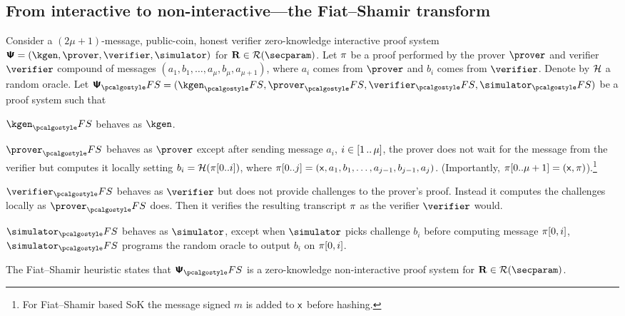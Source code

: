 \subsection{From interactive to non-interactive---the Fiat--Shamir transform}
Consider a $(2\mu + 1)$-message, public-coin, honest verifier zero-knowledge
interactive proof system
$\proofsystem = (\kgen, \prover, \verifier, \simulator)$ for
$\REL \in \RELGEN(\secparam)$.  Let $\pi$ be a proof performed by the
prover $\prover$ and verifier $\verifier$ compound of messages
$(a_1, b_1, \ldots, a_{\mu}, b_{\mu}, a_{\mu + 1})$, where $a_i$ comes from
$\prover$ and $b_i$ comes from $\verifier$.  Denote by $\mathcal{H}$ a random oracle.
Let $\proofsystem_\fs = (\kgen_\fs, \prover_\fs, \verifier_\fs, \simulator_\fs)$
be a proof system such that
\begin{compactitem}
  \item $\kgen_\fs$ behaves as $\kgen$.
  \item $\prover_\fs$ behaves as $\prover$ except after sending message
    $a_i$, $i \in [1 \, .. \, \mu]$, the prover does not wait for
    the message from the verifier but computes it locally setting $b_i
    = \mathcal{H}(\pi[0..i])$, where $\pi[0..j] = (\mathsf{x}, a_1, b_1, \ldots,
    a_{j - 1}, b_{j - 1}, a_j)$. (Importantly, $\pi[0..\mu + 1] =
    (\mathsf{x}, \pi)$).\footnote{For Fiat--Shamir based SoK the message signed $m$ is added to $\mathsf{x}$ before hashing.}
  \item $\verifier_\fs$ behaves as $\verifier$ but does not provide
    challenges to the prover's proof. Instead it computes the
    challenges locally as $\prover_\fs$ does. Then it verifies the
    resulting transcript $\pi$ as the verifier $\verifier$ would. 
  \item $\simulator_\fs$ behaves as $\simulator$, except when
    $\simulator$ picks challenge $b_i$ before computing message $\pi[0, i]$, $\simulator_\fs$ programs the
    random oracle to output $b_i$ on $\pi[0, i]$.
  \end{compactitem}

\noindent
The Fiat--Shamir heuristic states that $\proofsystem_\fs$ is a zero-knowledge
non-interactive proof system for $\REL \in \RELGEN(\secparam)$.

